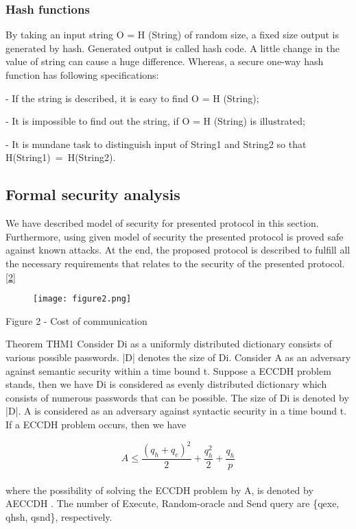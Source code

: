 \documentclass[preprint]{oscmjournal}
\begin{document}
\subsubsection{Hash functions}

By taking an input string O = H (String) of random size, a fixed size output is generated by hash. Generated output is called hash code. A little change in the value of string can cause a huge difference. Whereas, a secure one-way hash function has following specifications: 

- If the string is described, it is easy to find O = H (String);

- It is impossible to find out the string, if O = H (String) is illustrated;

- It is mundane task to distinguish input of String1 and String2 so that H(String1) = H(String2). 

\subsection{Formal security analysis}

We have described model of security for presented protocol in this section. Furthermore, using given model of security the presented protocol is proved safe against known attacks. At the end, the proposed protocol is described to fulfill all the necessary requirements that relates to the security of the presented protocol. \href{ Figure 2 - Cost of communication}{[2]}

\begin{figure}[H]
    \centering
    \texttt{[image: figure2.png]}

    \label{ Figure 2 - Cost of communication}
\end{figure}

Figure 2 - Cost of communication

Theorem THM1 Consider Di as a uniformly distributed dictionary consists of various possible passwords. |D| denotes the size of Di. Consider A as an adversary against semantic security within a time bound t. Suppose a ECCDH problem stands, then we have Di is considered as evenly distributed dictionary which consists of numerous passwords that can be possible. The size of Di is denoted by |D|. A is considered as an adversary against syntactic security in a time bound t. If a ECCDH problem occurs, then we have
\centering

 \[
 A \leq \frac{(q_h+q_e)^2}{2} + \frac{q_h^2}{2} + \frac{q_h}{p}  \]  \\
where the possibility of solving the ECCDH problem by A, is denoted by AECCDH ­. The number of Execute, Random-oracle and Send query are \{qexe, qhsh, qsnd\}, respectively.
\end{document}
